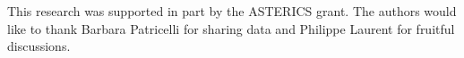 \documentclass[a0,portrait]{a0poster}
\begin{document}
\begin{multicols}{2}
{\footnotesize 
  This research was supported in part by the ASTERICS grant. The authors would like to thank Barbara Patricelli for sharing data and Philippe Laurent for fruitful discussions. }




\end{multicols}
\end{document}
